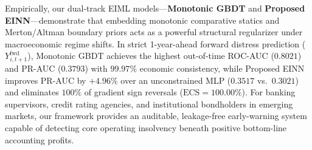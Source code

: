 \documentclass[11pt,a4paper]{article}
\begin{document}
Empirically, our dual-track EIML models---\textbf{Monotonic GBDT} and \textbf{Proposed EINN}---demonstrate that embedding monotonic comparative statics and Merton/Altman boundary priors acts as a powerful structural regularizer under macroeconomic regime shifts. In strict 1-year-ahead forward distress prediction ($Y_{i,t+1}^{\text{fwd}}$), Monotonic GBDT achieves the highest out-of-time ROC-AUC ($0.8021$) and PR-AUC ($0.3793$) with $99.97\%$ economic consistency, while Proposed EINN improves PR-AUC by $+4.96\%$ over an unconstrained MLP ($0.3517$ vs.\ $0.3021$) and eliminates $100\%$ of gradient sign reversals ($\text{ECS} = 100.00\%$). For banking supervisors, credit rating agencies, and institutional bondholders in emerging markets, our framework provides an auditable, leakage-free early-warning system capable of detecting core operating insolvency beneath positive bottom-line accounting profits.



\end{document}
